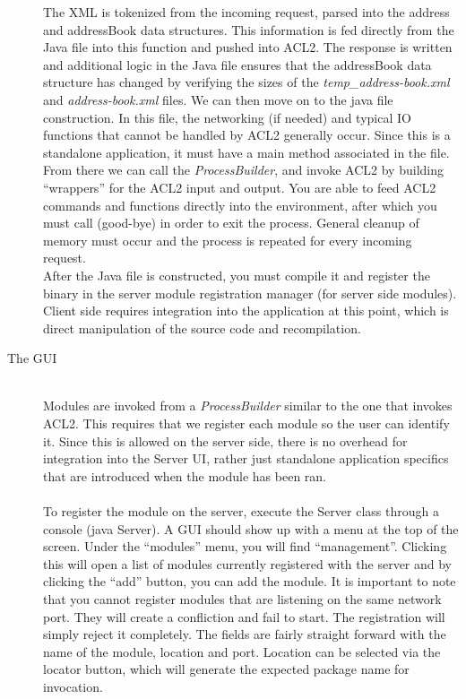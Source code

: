 \documentclass[11pt, letterpaper]{report}
\begin{document}
\begin{description}
The XML is tokenized from the incoming request, parsed into the address and addressBook data structures.  This information is fed directly from the Java file into this function and pushed into ACL2.  The response is written and additional logic in the Java file ensures that the addressBook data structure has changed by verifying the sizes of the \textit{temp\_address-book.xml} and \textit{address-book.xml} files.
We can then move on to the java file construction.  In this file, the networking (if needed) and typical IO functions that cannot be handled by ACL2 generally occur.  Since this is a standalone application, it must have a main method associated in the file.  From there we can call the \textit{ProcessBuilder}, and invoke ACL2 by building ``wrappers'' for the ACL2 input and output.  You are able to feed ACL2 commands and functions directly into the environment, after which you must call (good-bye) in order to exit the process.  General cleanup of memory must occur and the process is repeated for every incoming request.\\

After the Java file is constructed, you must compile it and register the binary in the server module registration manager (for server side modules).  Client side requires integration into the application at this point, which is direct manipulation of the source code and recompilation.\\
\item[The GUI]\hfill \\
Modules are invoked from a \textit{ProcessBuilder} similar to the one that invokes ACL2.  This requires that we register each module so the user can identify it.  Since this is allowed on the server side, there is no overhead for integration into the Server UI, rather just standalone application specifics that are introduced when the module has been ran.\\\\
To register the module on the server, execute the Server class through a console (java Server).  A GUI should show up with a menu at the top of the screen.  Under the ``modules'' menu, you will find ``management''.  Clicking this will open a list of modules currently registered with the server and by clicking the ``add'' button, you can add the module.  It is important to note that you cannot register modules that are listening on the same network port.  They will create a confliction and fail to start.  The registration will simply reject it completely.  The fields are fairly straight forward with the name of the module, location and port.  Location can be selected via the locator button, which will generate the expected package name for invocation.


\end{description}
\end{document}
